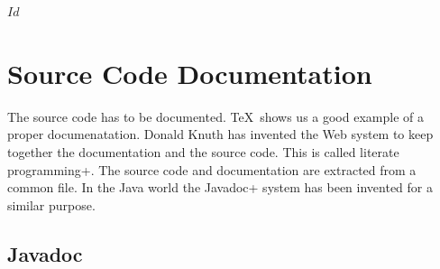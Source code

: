 \SVN$Id$
\chapter{Source Code Documentation}


The source code has to be documented. \TeX\ shows us a good example of
a proper documenatation. Donald Knuth has invented
the Web system to keep together the documentation and the source code.
This is called \+literate programming+. The source code and
documentation are extracted from a common file. In the Java world the
\+Javadoc+ system has been invented for a similar purpose.


\section{Javadoc}

